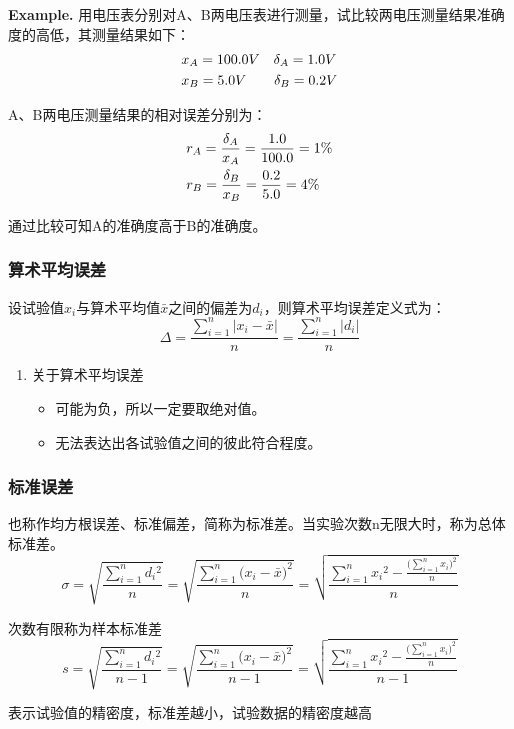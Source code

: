 \documentclass[UTF8]{ctexart}
\begin{document}
\textbf{Example.}
用电压表分别对A、B两电压表进行测量，试比较两电压测量结果准确度的高低，其测量结果如下：
\begin{equation}\notag
  \begin{aligned}
&x_{A}=100.0V \quad \delta_{A}=1.0V\\
&x_{B}=5.0V \qquad \delta_{B}=0.2V
  \end{aligned}
\end{equation}


\par A、B两电压测量结果的相对误差分别为：
\begin{equation}\notag
  \begin{aligned}
&r_{A}=\frac{\delta_{A}}{x_{A}}=\frac{1.0}{100.0}=1\%\\
&r_{B}=\frac{\delta_{B}}{x_{B}}=\frac{0.2}{5.0}=4\%\\
  \end{aligned}
\end{equation}
\par 通过比较可知A的准确度高于B的准确度。


\subsubsection{算术平均误差}
设试验值$x_i$与算术平均值$\bar{x}$之间的偏差为$d_{i}$，则算术平均误差定义式为：
\begin{equation}
  \Delta =\frac{\sum\limits_{i=1}^n\left\lvert x_{i}-\bar{x}\right\rvert }{n}=\frac{\sum\limits_{i=1}^n\left\lvert d_{i}\right\rvert }{n}
\end{equation}
\begin{enumerate}[•]
\item 关于算术平均误差
  \begin{itemize}
  \item 可能为负，所以一定要取绝对值。
  \item 无法表达出各试验值之间的彼此符合程度。
  \end{itemize} 
\end{enumerate}

\subsubsection{标准误差}
\par 也称作均方根误差、标准偏差，简称为标准差。当实验次数n无限大时，称为总体标准差。
  \begin{equation}
  \sigma =\sqrt{\frac{\sum\limits_{i=1}^n{d{_i}^2}}{n} } 
         =\sqrt{\frac{\sum\limits_{i=1}^n{({x_i}-\bar{x}})^2}{n} } 
         =\sqrt{\frac{\sum\limits_{i=1}^n{x{_i}^2}-\frac{(\sum\limits_{i=1}^n{x{_i})^2}}{n}}{n} } 
  \end{equation}
\par 次数有限称为样本标准差
  \begin{equation}
        s=\sqrt{\frac{\sum\limits_{i=1}^n{d{_i}^2}}{n-1} } 
         =\sqrt{\frac{\sum\limits_{i=1}^n{({x_i}-\bar{x}})^2}{n-1} } 
         =\sqrt{\frac{\sum\limits_{i=1}^n{x{_i}^2}-\frac{(\sum\limits_{i=1}^n{x{_i})^2}}{n}}{n-1} } 
  \end{equation}
\par 表示试验值的精密度，标准差越小，试验数据的精密度越高
\end{document}
